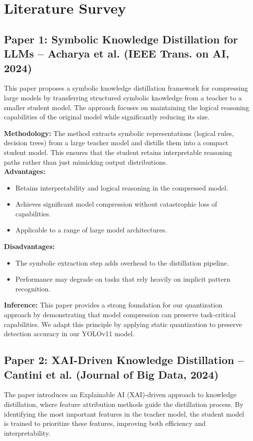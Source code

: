 \documentclass[11pt]{report}
\begin{document}
\section{Literature Survey}

\subsection{Paper 1: Symbolic Knowledge Distillation for LLMs -- Acharya et al. (IEEE Trans. on AI, 2024)}
This paper proposes a symbolic knowledge distillation framework for compressing large models by transferring structured symbolic knowledge from a teacher to a smaller student model. The approach focuses on maintaining the logical reasoning capabilities of the original model while significantly reducing its size. \par

\textbf{Methodology:} The method extracts symbolic representations (logical rules, decision trees) from a large teacher model and distills them into a compact student model. This ensures that the student retains interpretable reasoning paths rather than just mimicking output distributions. \\

\textbf{Advantages:}
\begin{itemize}
    \item Retains interpretability and logical reasoning in the compressed model.
    \item Achieves significant model compression without catastrophic loss of capabilities.
    \item Applicable to a range of large model architectures.
\end{itemize}

\textbf{Disadvantages:}
\begin{itemize}
    \item The symbolic extraction step adds overhead to the distillation pipeline.
    \item Performance may degrade on tasks that rely heavily on implicit pattern recognition.
\end{itemize}

\textbf{Inference:}
This paper provides a strong foundation for our quantization approach by demonstrating that model compression can preserve task-critical capabilities. We adapt this principle by applying static quantization to preserve detection accuracy in our YOLOv11 model.

\subsection{Paper 2: XAI-Driven Knowledge Distillation -- Cantini et al. (Journal of Big Data, 2024)}
The paper introduces an Explainable AI (XAI)-driven approach to knowledge distillation, where feature attribution methods guide the distillation process. By identifying the most important features in the teacher model, the student model is trained to prioritize these features, improving both efficiency and interpretability. \par
\end{document}
